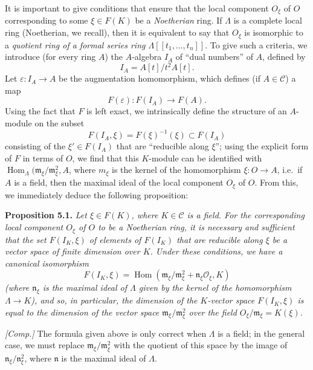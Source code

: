 \documentclass{article}
\newenvironment{itenv}[1]
  {\phantomsection\par\smallskip\noindent\textbf{#1.}\itshape}
  {\par\smallskip}
\newcommand{\oldpage}[1]{\marginpar{\footnotesize$\Big\vert$ \textit{p.~#1}}}
\theoremstyle{definition}
\theoremstyle{definition}
\theoremstyle{definition}
\theoremstyle{definition}
\theoremstyle{remark}
\begin{document}
It is important to give conditions that ensure that the local component \(O_\xi\) of \(O\) corresponding to some \(\xi\in F(K)\) be a \emph{Noetherian} ring.
If \(\Lambda\) is a complete local ring (Noetherian, we recall), then it is equivalent to say that \(O_\xi\) is isomorphic to a \emph{quotient ring of a formal series ring \(\Lambda[[t_1,\ldots,t_n]]\)}.
To give such a criteria, we introduce (for every ring \(A\)) the \(A\)-algebra \(I_A\) of ``dual numbers'' of \(A\), defined by
\[
  I_A = A[t]/t^2A[t].
\]
Let \(\varepsilon\colon I_A\to A\) be the augmentation homomorphism, which defines (if \(A\in{\mathcal{C}}\)) a map
\[
  F(\varepsilon)\colon F(I_A) \to F(A).
\]
\oldpage{195-08}Using the fact that \(F\) is left exact, we intrinsically define the structure of an \(A\)-module on the subset
\[
  F(I_A,\xi) = F(\xi)^{-1}(\xi) \subset F(I_A)
\]
consisting of the \(\xi'\in F(I_A)\) that are ``reducible along \(\xi\)'';
using the explicit form of \(F\) in terms of \(O\), we find that this \(K\)-module can be identified with \(\operatorname{Hom}_\Lambda({\mathfrak{m}}_\xi/{\mathfrak{m}}_\xi^2,A\), where \(m_\xi\) is the kernel of the homomorphism \(\xi\colon O\to A\), i.e.~if \(A\) is a field, then the maximal ideal of the local component \(O_\xi\) of \(O\).
From this, we immediately deduce the following proposition:

\leavevmode{}%
\begin{itenv}{Proposition 5.1}
Let \(\xi\in F(K)\), where \(K\in{\mathcal{C}}\) is a field.
For the corresponding local component \(O_\xi\) of \(O\) to be a \emph{Noetherian} ring, it is necessary and sufficient that the set \(F(I_K,\xi)\) of elements of \(F(I_K)\) that are reducible along \(\xi\) be a vector space of \emph{finite dimension} over \(K\).
Under these conditions, we have a canonical isomorphism
\[
  F(I_K,\xi) = \operatorname{Hom}({\mathfrak{m}}_\xi/{\mathfrak{m}}_\xi^2+{\mathfrak{n}}_\xi{\mathscr{O}}_\xi, K)
\]
(where \({\mathfrak{n}}_\xi\) is the maximal ideal of \(\Lambda\) given by the kernel of the homomorphism \(\Lambda\to K\)), and so, in particular, the dimension of the \(K\)-vector space \(F(I_K,\xi)\) is equal to the dimension of the vector space \({\mathfrak{m}}_\xi/{\mathfrak{m}}_\xi^2\) over the field \(O_\xi/{\mathfrak{m}}_\xi=K(\xi)\).

\emph{{[}Comp.{]}} The formula given above is only correct when \(\Lambda\) is a field; in the general case, we must replace \({\mathfrak{m}}_\xi/{\mathfrak{m}}_\xi^2\) with the quotient of this space by the image of \({\mathfrak{n}}_\xi/{\mathfrak{n}}_\xi^2\), where \({\mathfrak{n}}\) is the maximal ideal of \(\Lambda\).

\end{itenv}
\end{document}
